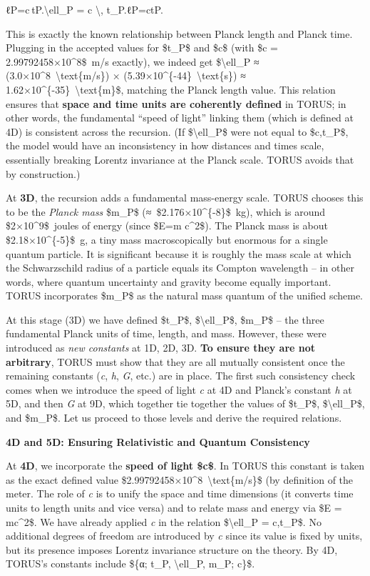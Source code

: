 \documentclass[]{article}
\begin{document}
ℓP=c tP.\textbackslash{}ell\_P = c \textbackslash{}, t\_P.ℓP​=ctP​.

This is exactly the known relationship between Planck length and Planck
time. Plugging in the accepted values for \$t\_P\$ and \$c\$ (with \$c =
2.99792458×10\^{}8\$~m/s exactly), we indeed get
\$\textbackslash{}ell\_P ≈ (3.0×10\^{}8~\textbackslash{}text\{m/s\}) ×
(5.39×10\^{}\{-44\}~\textbackslash{}text\{s\}) ≈
1.62×10\^{}\{-35\}~\textbackslash{}text\{m\}\$, matching the Planck
length value. This relation ensures that \textbf{space and time units
are coherently defined} in TORUS; in other words, the fundamental
``speed of light'' linking them (which is defined at 4D) is consistent
across the recursion. (If \$\textbackslash{}ell\_P\$ were not equal to
\$c,t\_P\$, the model would have an inconsistency in how distances and
times scale, essentially breaking Lorentz invariance at the Planck
scale. TORUS avoids that by construction.)

At \textbf{3D}, the recursion adds a fundamental mass-energy scale.
TORUS chooses this to be the \emph{Planck mass} \$m\_P\$
(≈~\$2.176×10\^{}\{-8\}\$~kg)​, which is around \$2×10\^{}9\$~joules of
energy (since \$E=m c\^{}2\$). The Planck mass is about
\$2.18×10\^{}\{-5\}\$~g, a tiny mass macroscopically but enormous for a
single quantum particle. It is significant because it is roughly the
mass scale at which the Schwarzschild radius of a particle equals its
Compton wavelength​ -- in other words, where quantum uncertainty and
gravity become equally important. TORUS incorporates \$m\_P\$ as the
natural mass quantum of the unified scheme.

At this stage (3D) we have defined \$t\_P\$, \$\textbackslash{}ell\_P\$,
\$m\_P\$ -- the three fundamental Planck units of time, length, and
mass. However, these were introduced as \emph{new constants} at 1D, 2D,
3D. \textbf{To ensure they are not arbitrary}, TORUS must show that they
are all mutually consistent once the remaining constants (\emph{c},
\emph{h}, \emph{G}, etc.) are in place. The first such consistency check
comes when we introduce the speed of light \emph{c} at 4D and Planck's
constant \emph{h} at 5D, and then \emph{G} at 9D, which together tie
together the values of \$t\_P\$, \$\textbackslash{}ell\_P\$, and
\$m\_P\$. Let us proceed to those levels and derive the required
relations.

\textbf{4D and 5D: Ensuring Relativistic and Quantum Consistency}

At \textbf{4D}, we incorporate the \textbf{speed of light \$c\$}. In
TORUS this constant is taken as the exact defined value
\$2.99792458×10\^{}8~\textbackslash{}text\{m/s\}\$ (by definition of the
meter. The role of \emph{c} is to unify the space and time dimensions
(it converts time units to length units and vice versa) and to relate
mass and energy via \$E = mc\^{}2\$. We have already applied \emph{c} in
the relation \$\textbackslash{}ell\_P = c,t\_P\$. No additional degrees
of freedom are introduced by \emph{c} since its value is fixed by units,
but its presence imposes Lorentz invariance structure on the theory. By
4D, TORUS's constants include \$\{α; t\_P, \textbackslash{}ell\_P, m\_P;
c\}\$.
\end{document}
